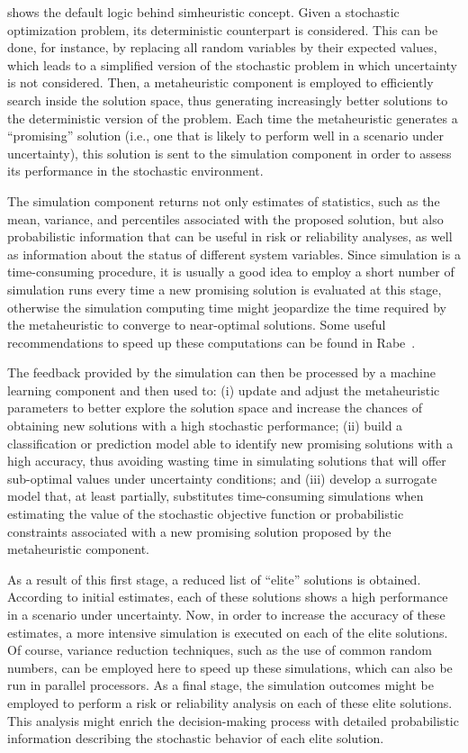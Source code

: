  shows the default logic behind simheuristic
concept. Given a stochastic optimization problem, its deterministic counterpart
is considered. This can be done, for instance, by replacing all random variables
by their expected values, which leads to a simplified version of the stochastic
problem in which uncertainty is not considered. Then, a metaheuristic component
is employed to efficiently search inside the solution space, thus generating
increasingly better solutions to the deterministic version of the problem. Each
time the metaheuristic generates a ``promising'' solution (i.e., one that is
likely to perform well in a scenario under uncertainty), this solution is sent
to the simulation component in order to assess its performance in the stochastic
environment.

The simulation component returns not only estimates of statistics, such as the
mean, variance, and percentiles associated with the proposed solution, but also
probabilistic information that can be useful in risk or reliability analyses, as
well as information about the status of different system variables. Since
simulation is a time-consuming procedure, it is usually a good idea to employ a
short number of simulation runs every time a new promising solution is evaluated
at this stage, otherwise the simulation computing time might jeopardize the time
required by the metaheuristic to converge to near-optimal solutions.  Some
useful recommendations to speed up these computations can be found in
Rabe~\cite{rabe:2020}.

The feedback provided by the simulation can then be processed by a machine
learning component and then used to: (i) update and adjust the metaheuristic
parameters to better explore the solution space and increase the chances of
obtaining new solutions with a high stochastic performance; (ii) build a
classification or prediction model able to identify new promising solutions with
a high accuracy, thus avoiding wasting time in simulating solutions that will
offer sub-optimal values under uncertainty conditions; and (iii) develop a
surrogate model that, at least partially, substitutes time-consuming simulations
when estimating the value of the stochastic objective function or probabilistic
constraints associated with a new promising solution proposed by the
metaheuristic component.

As a result of this first stage, a reduced list of ``elite'' solutions is
obtained. According to initial estimates, each of these solutions shows a
high performance in a scenario under uncertainty. Now, in order to increase the
accuracy of these estimates, a more intensive simulation is executed on each of
the elite solutions. Of course, variance reduction techniques, such as the use
of common random numbers, can be employed here to speed up these simulations,
which can also be run in parallel processors. As a final stage, the simulation
outcomes might be employed to perform a risk or reliability analysis on each of
these elite solutions. This analysis might enrich the decision-making process
with detailed probabilistic information describing the stochastic behavior of
each elite solution.

